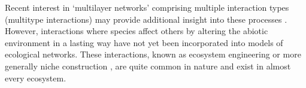 \documentclass[twocolumn,preprintnumbers,amsmath,amssymb,superscriptaddress,linenumbers]{revtex4-1}
\begin{document}
\begin{bibunit}
Recent interest in `multilayer networks' comprising multiple interaction types (multitype interactions) may provide additional insight into these processes \cite{Kefi2016,Pilosof2017}. 
However, interactions where species affect others by altering the abiotic environment in a lasting way have not yet been incorporated into models of ecological networks. 
These interactions, known as ecosystem engineering \cite{Lawton1994,OdlingSmee2013} or more generally niche construction \cite{OdlingSmee2013b,Fukami2015}, are quite common in nature and exist in almost every ecosystem.





\end{bibunit}
\end{document}

